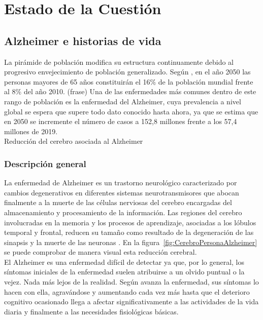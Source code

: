 \chapter{Estado de la Cuestión}
\label{cap:estadoDeLaCuestion}


\section{Alzheimer e historias de vida}
La pirámide de población modifica su estructura continuamente debido al progresivo envejecimiento de población generalizado. Según \cite{estalz}, en el año 2050 las personas mayores de 65 años constituirán el 16\% de la población mundial frente al 8\%  del año 2010. (frase) Una de las enfermedades más comunes dentro de este rango de población es la enfermedad del Alzheimer, cuya prevalencia a nivel global se espera que supere todo dato conocido hasta ahora, ya que se estima que en 2050 se incremente el número de casos a 152,8 millones frente a los 57,4 millones de 2019.\\


%
{Reducción del cerebro asociada al Alzheimer  \citep{mattson2004pathways}}


\subsection{Descripción general}
La enfermedad de Alzheimer es un trastorno neurológico caracterizado por cambios degenerativos en diferentes sistemas neurotransmisores que abocan finalmente a la muerte de las células nerviosas del cerebro encargadas del almacenamiento y procesamiento de la información. Las regiones del cerebro involucradas en la memoria y los procesos de aprendizaje, asociadas a los lóbulos temporal y frontal, reducen su tamaño como resultado de la degeneración de las sinapsis y la muerte de las neuronas \citep{romano2007enfermedad,mattson2004pathways}. En la figura~\ref{fig:CerebroPersonaAlzheimer} se puede comprobar de manera visual esta reducción cerebral.\\


El Alzheimer es una enfermedad difícil de detectar ya que, por lo general, los síntomas iniciales de la enfermedad suelen atribuirse a un olvido puntual o la vejez. Nada más lejos de la realidad. Según avanza la enfermedad, sus síntomas lo hacen con ella, agravándose y aumentando cada vez más hasta que el deterioro cognitivo ocasionado llega a afectar significativamente a las actividades de la vida diaria y finalmente a las necesidades fisiológicas básicas.\\


